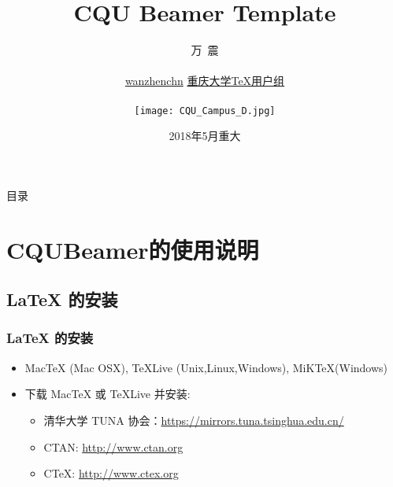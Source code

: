 \documentclass[8pt,aspectratio=169,mathserif,UTF8]{beamer}
\begin{document}
\beamertemplatenavigationsymbolsempty
 
\title{ CQU Beamer Template}	     %
\author[万震（重庆大学）]{
万\ 震\\
\vskip5pt
{\color{blue}\faEnvelopeO}\\
{\color{blue}\faGithub}\hspace{0.1cm} {\href{https://github.com/wanzhenchn}{wanzhenchn}}
\vskip5pt
\href{https://github.com/CQUtug}{重庆大学TeX用户组}\\
  \begin{center}
  \texttt{[image: CQU\_Campus\_D.jpg]}%
  \end{center}
  \vskip-35pt
}

\date[2018年5月]{2018年5月\quad 重大}
 
\begin{frame}[plain]
  \vskip25pt
  \titlepage
\end{frame}
\setcounter{framenumber}{0}				

\section*{}   
\begin{frame}{目录}
  \begin{multicols}{2}
    \tableofcontents[subsubsectionstyle=hide]  
  \end{multicols}
\end{frame}			

\section{CQUBeamer的使用说明}
\subsection{LaTeX 的安装}
\begin{frame}
  \frametitle{LaTeX 的安装}
     \begin{itemize}
      \item MacTeX (Mac OSX), TeXLive (Unix,Linux,Windows), MiKTeX(Windows)
      \item 下载 MacTeX 或 TeXLive 并安装:
         \begin{itemize}
          \item 清华大学 TUNA 协会：\href{https://mirrors.tuna.tsinghua.edu.cn/}{https://mirrors.tuna.tsinghua.edu.cn/}
           \item CTAN: \href{http://www.ctan.org}{http://www.ctan.org}
          \item  CTeX: \href{http://www.ctex.org}{http://www.ctex.org}
         \end{itemize}
      \end{itemize}
\end{frame}
\end{document}
